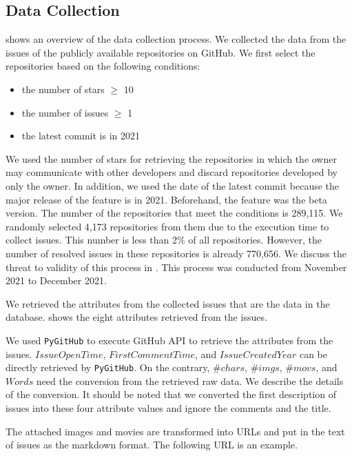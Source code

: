 \subsection{Data Collection}
 shows
an overview of the data collection process.
We collected the data from the issues of 
the publicly available repositories on GitHub. 
We first select the repositories based on the following conditions:
\begin{itemize}
	\item the number of stars $\geq$ 10
	\item the number of issues $\geq$ 1
	\item the latest commit is in 2021
\end{itemize}
We used the number of stars for retrieving the repositories 
in which the owner may communicate with other developers and 
discard repositories developed by only the owner. 
In addition, we used the date of the latest commit 
because the major release of the feature is in 2021. 
Beforehand, the feature was the beta version. 
The number of the repositories that meet 
the conditions is 289,115. 
We randomly selected 4,173 repositories from them 
due to the execution time to collect issues. 
This number is less than 2\% of all repositories. 
However, the number of resolved issues 
in these repositories is already 770,656. 
We discuss the threat to validity of 
this process in . 
This process was conducted from November 2021 to December 2021.



We retrieved the attributes from the collected issues 
that are the data in the database. 
 shows the eight attributes 
retrieved from the issues. 

We used \texttt{PyGitHub} to execute GitHub API 
to retrieve the attributes from the issues. 
$IssueOpenTime$, $FirstCommentTime$,
and $IssueCreatedYear$ can be directly
retrieved by \texttt{PyGitHub}.
On the contrary,
$\#chars$, $\#imgs$, $\#movs$, and $Words$
need the conversion from the retrieved raw data.
We describe the details of the conversion. 
It should be noted that we converted the first description of 
issues into these four attribute values and 
ignore the comments and the title.

The attached images and movies are transformed into 
URLs and put in the text of issues as the markdown format. 
The following URL is an example.

